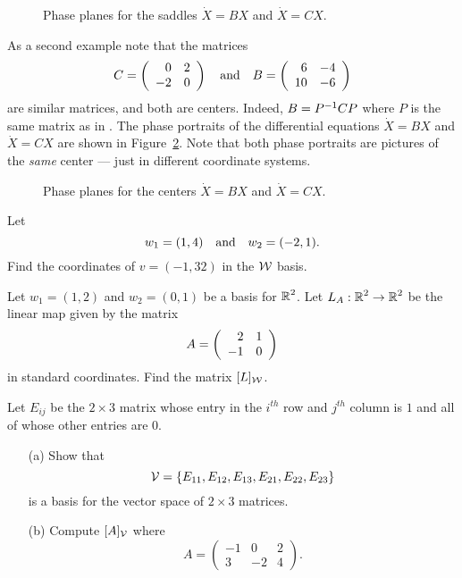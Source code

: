 \documentclass{ximera}
\begin{document}
\begin{figure}[htb]
        \centerline{%
        }
        \caption{Phase planes for the saddles $\dot{X}=BX$ and $\dot{X}=CX$.}
        \label{F:comparesim}
\end{figure}

As a second example note that the matrices
\[
C = \left(\begin{array}{rr} 0 & 2\\ -2 &0\end{array}\right) \quad\mbox{and}\quad B = \left(\begin{array}{rr} 6 & -4\\ 10 &-6\end{array}\right)
\]
are similar matrices, and both are centers.   Indeed, $B = P^{-1} CP$
where $P$ is the same matrix as in .  The phase portraits
of the differential equations $\dot{X}=BX$ and $\dot{X}=CX$ are shown in
Figure~\ref{F:comparesim2}.  Note that both phase portraits are pictures
of the {\em same\/} center --- just in different coordinate
systems.



\begin{figure}[htb]
        \centerline{%
        }
        \caption{Phase planes for the centers $\dot{X}=BX$ and $\dot{X}=CX$.}
        \label{F:comparesim2}
\end{figure}






\EXER

\TEXER

\begin{exercise} \label{c7.1.1}
Let
\[
w_1 = (1,4) \quad\mbox{and}\quad w_2 = (-2,1).
\]
Find the coordinates of $v=(-1,32)$ in the ${\cal W}$ basis.
\end{exercise}

\begin{exercise} \label{c7.3.1}
Let $w_1=(1,2)$ and $w_2=(0,1)$ be a basis for $\mbox{$\Bbb{R}$}^2$.  Let
$L_A:\mbox{$\Bbb{R}$}^2\to\mbox{$\Bbb{R}$}^2$ be the linear map given by the matrix
\[
A=\left(\begin{array}{rr} 2 & 1\\ -1 &0\end{array}\right)
\]
in standard coordinates.  Find the matrix $[L]_{\cal W}$.
\end{exercise}

\begin{exercise} \label{c7.1.3}
Let $E_{ij}$ be the $2\times 3$ matrix whose entry in the
$i^{th}$ row and $j^{th}$ column is $1$ and all of whose
other entries are $0$.
\begin{itemize}
\item[(a)]  Show that
\[
{\cal V}=\{E_{11},E_{12},E_{13},E_{21},E_{22},E_{23}\}
\]
is a basis for the vector space of $2\times 3$ matrices.
\item[(b)]   Compute $[A]_{\cal V}$ where
\[
A=\left(\begin{array}{rrr} -1 & 0 & 2\\ 3 & -2 & 4\end{array}\right).
\]
\end{itemize}
\end{exercise}
\end{document}
